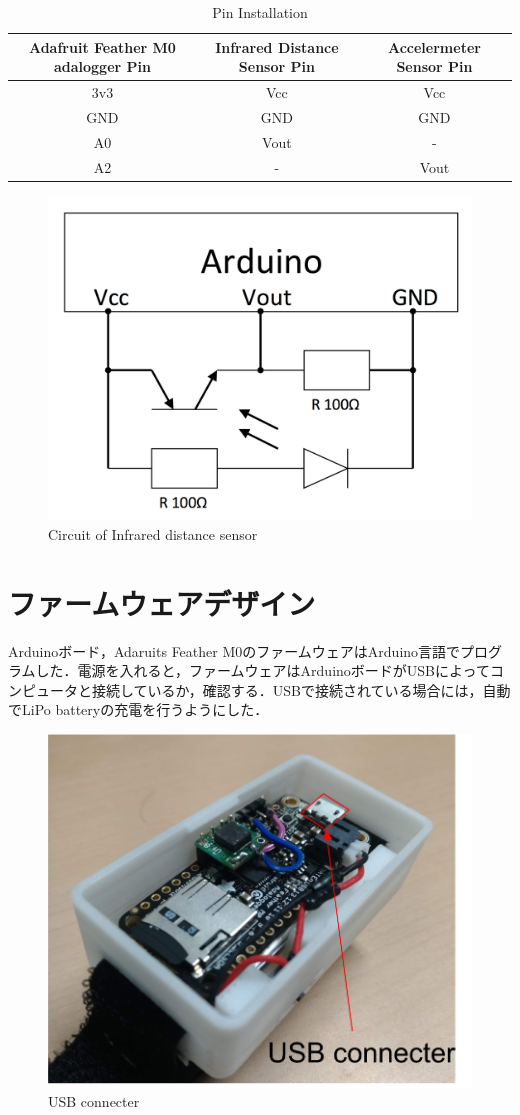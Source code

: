 \begin{table}[H]
  \caption{Pin Installation}
  \centering
  \begin{tabular}{ccc}
    \hline
    Adafruit Feather M0 adalogger Pin & Infrared Distance Sensor Pin & Accelermeter Sensor Pin\\
    \hline \hline
    3v3 & Vcc & Vcc  \\
    GND & GND & GND  \\
    A0  & Vout& - \\
    A2  & -& Vout \\
    \hline
  \end{tabular}
   \label{table:pin}
\end{table}

\begin{figure}[H]
  \centering
  \includegraphics[width=0.8\linewidth]{fig/circuit}
  \caption{Circuit of Infrared distance sensor }
  \label{fig:circuit}{}
\end{figure}


\section{ファームウェアデザイン}
Arduinoボード，Adaruits Feather M0のファームウェアはArduino言語でプログラムした．電源を入れると，ファームウェアはArduinoボードがUSBによってコンピュータと接続しているか，確認する．USBで接続されている場合には，自動でLiPo batteryの充電を行うようにした．

\begin{figure}[H]
  \centering
  \includegraphics[width=0.5\linewidth]{fig/usbconne}
  \caption{USB connecter}
  \label{fig:USB connecter}
\end{figure}


